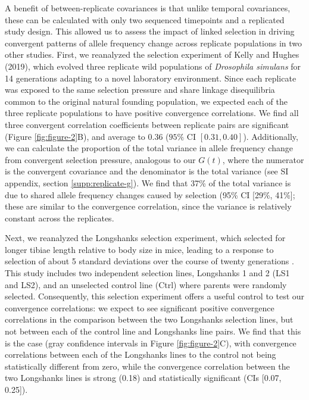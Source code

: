 \documentclass[9pt,twocolumn,twoside]{pnas-new}
\begin{document}
A benefit of between-replicate covariances is that unlike temporal covariances,
these can be calculated with only two sequenced timepoints and a replicated
study design. This allowed us to assess the impact of linked selection in
driving convergent patterns of allele frequency change across replicate
populations in two other studies. First, we reanalyzed the selection experiment
of Kelly and Hughes (2019), which evolved three replicate wild populations of
\emph{Drosophila simulans} for 14 generations adapting to a novel laboratory
environment. Since each replicate was exposed to the same selection pressure
and share linkage disequilibria common to the original natural founding
population, we expected each of the three replicate populations to have
positive convergence correlations.  We find all three convergent
correlation coefficients between replicate pairs are significant (Figure
\ref{fig:figure-2}B), and average to 0.36 ($95\%$ CI $[0.31, 0.40]$).
Additionally, we can calculate the proportion of the total variance in
allele frequency change from convergent selection pressure, analogous to
our $G(t)$, where the numerator is the convergent covariance and the
denominator is the total variance (see SI appendix, section
\ref{supp:replicate-g}). We find that 37\% of the total variance is due to
shared allele frequency changes caused by selection (95\% CI [29\%, 41\%];
these are similar to the convergence correlation, since the variance is
relatively constant across the replicates.


Next, we reanalyzed the Longshanks selection experiment, which selected for
longer tibiae length relative to body size in mice, leading to a response to
selection of about 5 standard deviations over the course of twenty generations
\cite{Marchini2014-de,Castro2019-uk}. This study includes two independent
selection lines, Longshanks 1 and 2 (LS1 and LS2), and an unselected control
line (Ctrl) where parents were randomly selected. Consequently, this selection
experiment offers a useful control to test our convergence correlations: we
expect to see significant positive convergence correlations in the comparison
between the two Longshanks selection lines, but not between each of the control
line and Longshanks line pairs. We find that this is the case (gray confidence
intervals in Figure \ref{fig:figure-2}C), with convergence correlations between
each of the Longshanks lines to the control not being statistically different
from zero, while the convergence correlation between the two Longshanks lines
is strong (0.18) and statistically significant (CIs [0.07, 0.25]).
\end{document}
